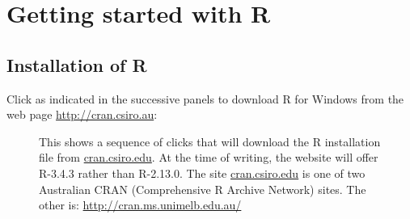 \documentclass{tufte-book}\usepackage[]{graphicx}\usepackage[]{color}
\begin{document}
\mainmatter
\setcounter{secnumdepth}{2}
\setcounter{tocdepth}{2}

\chapter{Getting started with R}\label{ch:getStart}







\section{Installation of R}

Click as indicated in the successive panels to download R for
Windows from the web page \url{http://cran.csiro.au}:
\vspace*{-3pt}

\begin{figure}
\vspace*{2pt}

\vspace*{2pt}

\caption{This shows a sequence of clicks that will download
  the R installation file from \url{cran.csiro.edu}. At the time of writing,
  the website will offer R-3.4.3 rather than R-2.13.0. The site
  \url{cran.csiro.edu} is one of two Australian CRAN (Comprehensive R Archive
  Network) sites. The other is:
  \url{http://cran.ms.unimelb.edu.au/}}
\end{figure}
\end{document}
